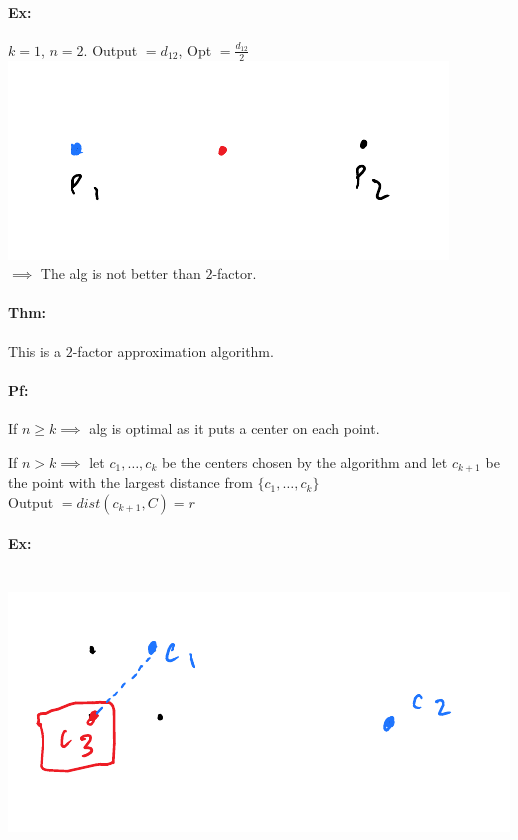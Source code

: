 \documentclass[12 pt]{article}
\begin{document}
          \paragraph{Ex:} $k=1$, $n=2$. Output $= d_{12}$, Opt $=
          \frac{d_{12}}{2}$
          \\ \includegraphics[width=.9\textwidth]{i154.pdf}
          \\ $\implies$ The alg is not better than $2$-factor.
          \paragraph{Thm:} This is a $2$-factor approximation
          algorithm.
          \paragraph{Pf:} If $n \geq k \implies $ alg is optimal as
          it puts a center on each point.

          If $n>k \implies$ let $c_1, \ldots, c_k$ be the centers
          chosen by the algorithm and let $c_{k+1}$ be the point with
          the largest distance from $\{c_1,\ldots,c_k\}$
          \\ Output $= dist (c_{k+1},C) = r$
          \paragraph{Ex:}
          ~\\\includegraphics[width=.9\textwidth]{i155.pdf}
\end{document}

